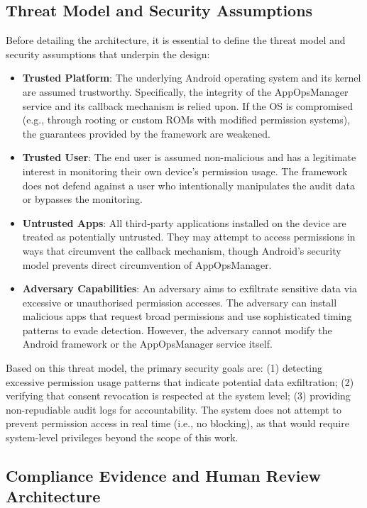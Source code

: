 \subsection{Threat Model and Security Assumptions}

Before detailing the architecture, it is essential to define the threat model and security assumptions that underpin the design:

\begin{itemize}
\item \textbf{Trusted Platform}: The underlying Android operating system and its kernel are assumed trustworthy. Specifically, the integrity of the AppOpsManager service and its callback mechanism is relied upon. If the OS is compromised (e.g., through rooting or custom ROMs with modified permission systems), the guarantees provided by the framework are weakened.
\item \textbf{Trusted User}: The end user is assumed non-malicious and has a legitimate interest in monitoring their own device's permission usage. The framework does not defend against a user who intentionally manipulates the audit data or bypasses the monitoring.
\item \textbf{Untrusted Apps}: All third-party applications installed on the device are treated as potentially untrusted. They may attempt to access permissions in ways that circumvent the callback mechanism, though Android's security model prevents direct circumvention of AppOpsManager.
\item \textbf{Adversary Capabilities}: An adversary aims to exfiltrate sensitive data via excessive or unauthorised permission accesses. The adversary can install malicious apps that request broad permissions and use sophisticated timing patterns to evade detection. However, the adversary cannot modify the Android framework or the AppOpsManager service itself.
\end{itemize}

Based on this threat model, the primary security goals are: (1) detecting excessive permission usage patterns that indicate potential data exfiltration; (2) verifying that consent revocation is respected at the system level; (3) providing non-repudiable audit logs for accountability. The system does not attempt to prevent permission access in real time (i.e., no blocking), as that would require system-level privileges beyond the scope of this work.

\subsection{Compliance Evidence and Human Review Architecture}

